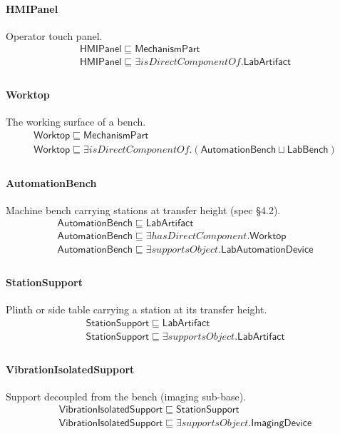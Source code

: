 \documentclass[10pt]{article}
\begin{document}
\paragraph{HMIPanel} Operator touch panel.
\[\begin{array}{l}
\mathsf{HMIPanel} \sqsubseteq  \mathsf{MechanismPart} \\
\mathsf{HMIPanel} \sqsubseteq  \exists \mathit{isDirectComponentOf}.\mathsf{LabArtifact} \\
\end{array}\]
\paragraph{Worktop} The working surface of a bench.
\[\begin{array}{l}
\mathsf{Worktop} \sqsubseteq  \mathsf{MechanismPart} \\
\mathsf{Worktop} \sqsubseteq  \exists \mathit{isDirectComponentOf}.(\mathsf{AutomationBench} \sqcup  \mathsf{LabBench}) \\
\end{array}\]
\paragraph{AutomationBench} Machine bench carrying stations at transfer height (spec §4.2).
\[\begin{array}{l}
\mathsf{AutomationBench} \sqsubseteq  \mathsf{LabArtifact} \\
\mathsf{AutomationBench} \sqsubseteq  \exists \mathit{hasDirectComponent}.\mathsf{Worktop} \\
\mathsf{AutomationBench} \sqsubseteq  \exists \mathit{supportsObject}.\mathsf{LabAutomationDevice} \\
\end{array}\]
\paragraph{StationSupport} Plinth or side table carrying a station at its transfer height.
\[\begin{array}{l}
\mathsf{StationSupport} \sqsubseteq  \mathsf{LabArtifact} \\
\mathsf{StationSupport} \sqsubseteq  \exists \mathit{supportsObject}.\mathsf{LabArtifact} \\
\end{array}\]
\paragraph{VibrationIsolatedSupport} Support decoupled from the bench (imaging sub-base).
\[\begin{array}{l}
\mathsf{VibrationIsolatedSupport} \sqsubseteq  \mathsf{StationSupport} \\
\mathsf{VibrationIsolatedSupport} \sqsubseteq  \exists \mathit{supportsObject}.\mathsf{ImagingDevice} \\
\end{array}\]
\end{document}
